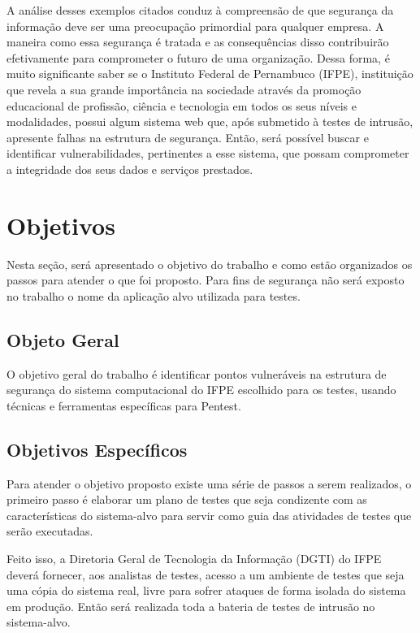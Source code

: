 \documentclass[
    12pt,               %
    openright,          %
    oneside,            %
    a4paper,            %
    section=TITLE,     %
    english,            %
    french,             %
    spanish,            %
    brazil              %
    ]{abntex2}
\begin{document}
A análise desses exemplos citados conduz à compreensão de que segurança da informação deve ser uma preocupação primordial para qualquer empresa. A maneira como essa segurança é tratada e as consequências disso contribuirão efetivamente para comprometer o futuro de uma organização. Dessa forma, é muito significante saber se o Instituto Federal de Pernambuco (IFPE), instituição que revela a sua grande importância na sociedade através da promoção educacional de profissão, ciência e tecnologia em todos os seus níveis e modalidades, possui algum sistema web que, após submetido à testes de intrusão, apresente falhas na estrutura de segurança. Então, será possível buscar e identificar vulnerabilidades, pertinentes a esse sistema, que possam comprometer a integridade dos seus dados e serviços prestados.



\section{Objetivos}

Nesta seção, será apresentado o objetivo do trabalho e como estão organizados os passos para atender o que foi proposto. Para fins de segurança não será exposto no trabalho o nome da aplicação alvo utilizada para testes.



\subsection{Objeto Geral}

O objetivo geral do trabalho é identificar pontos vulneráveis na estrutura de segurança do sistema computacional do IFPE escolhido para os testes, usando técnicas e ferramentas específicas para Pentest.



\subsection{Objetivos Específicos}

Para atender o objetivo proposto existe uma série de passos a serem realizados, o primeiro passo é elaborar um plano de testes que seja condizente com as características do sistema-alvo para servir como guia das atividades de testes que serão executadas.


Feito isso, a Diretoria Geral de Tecnologia da Informação (DGTI) do IFPE deverá fornecer, aos analistas de testes, acesso a um ambiente de testes que seja uma cópia do sistema real, livre para sofrer ataques de forma isolada do sistema em produção. Então será realizada toda a bateria de testes de intrusão no sistema-alvo.
\end{document}
